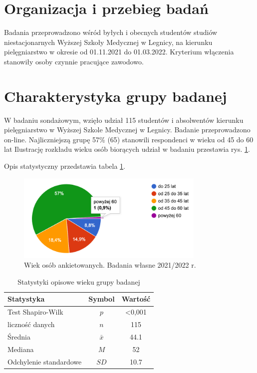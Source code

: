 \documentclass[a4paper,12pt,twoside,openright]{mwrep}
\begin{document}
\section{Organizacja i przebieg badań}
Badania przeprowadzono wśród byłych i obecnych studentów studiów niestacjonarnych Wyższej Szkoły Medycznej w Legnicy, na kierunku pielęgniarstwo w okresie od 01.11.2021 do 01.03.2022. Kryterium włączenia stanowiły osoby czynnie pracujące zawodowo. 


\section{Charakterystyka grupy badanej}


W badaniu sondażowym, wzięło udział 115  studentów  i absolwentów  kierunku pielęgniarstwo w Wyższej Szkole Medycznej w Legnicy. Badanie przeprowadzono on-line.  Najliczniejszą grupę 57\%  (65) stanowili respondenci w wieku od 45 do 60 lat 
Ilustrację rozkładu wieku osób biorących udział w badaniu przestawia rys. \ref{rys:wiek}.

Opis statystyczny przedstawia tabela \ref{tab:wiek}.


\begin{figure}[H]
\centering
\includegraphics[width=9cm]{char_gr_bad/wiek00}
\caption{Wiek osób ankietowanych. Badania własne 2021/2022 r.}
\label{rys:wiek}
\end{figure}


\begin {table}[H]
\caption{Statystyki opisowe wieku grupy badanej}
\centering
\begin{tabular}{|l|c|c|}
\hline
Statystyka & Symbol & Wartość\\
\hline
Test Shapiro-Wilk & $p$ & <0,001\\
\hline
liczność danych & $n$ & 115\\
\hline
Średnia & $\bar{x}$ & 44.1\\
\hline
Mediana & $M$ & 52\\
\hline
Odchylenie standardowe & $SD$ & 10.7\\
\hline

\end{tabular}
\label{tab:wiek}
\end{table}
\end{document}
